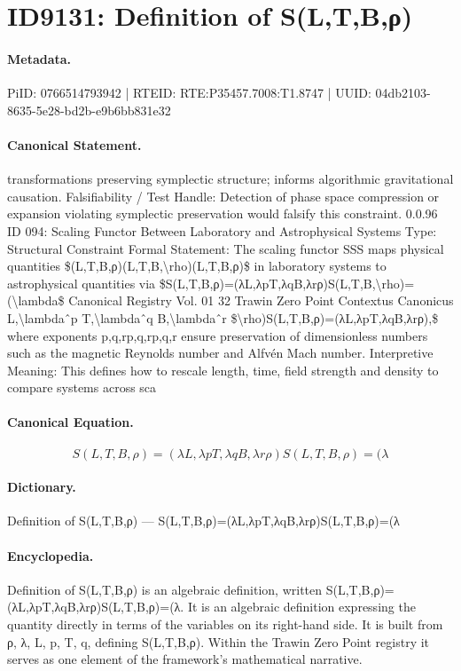 \section*{ID9131: Definition of S(L,T,B,ρ)}
\paragraph{Metadata.}
PiID: 0766514793942 | RTEID: RTE:P35457.7008:T1.8747 | UUID: 04db2103-8635-5e28-bd2b-e9b6bb831e32

\paragraph{Canonical Statement.}
transformations preserving symplectic structure; informs algorithmic gravitational causation. Falsifiability / Test Handle: Detection of phase space compression or expansion violating symplectic preservation would falsify this constraint. 0.0.96 ID 094: Scaling Functor Between Laboratory and Astrophysical Systems Type: Structural Constraint Formal Statement: The scaling functor SSS maps physical quantities \$(L,T,B,ρ)(L,T,B,\textbackslash{}rho)(L,T,B,ρ)\$ in laboratory systems to astrophysical quantities via \$S(L,T,B,ρ)=(λL,λpT,λqB,λrρ)S(L,T,B,\textbackslash{}rho)=(\textbackslash{}lambda\$ Canonical Registry Vol. 01 32 Trawin Zero Point Contextus Canonicus L,\textbackslash{}lambdaˆp T,\textbackslash{}lambdaˆq B,\textbackslash{}lambdaˆr \$\textbackslash{}rho)S(L,T,B,ρ)=(λL,λpT,λqB,λrρ),\$ where exponents p,q,rp,q,rp,q,r ensure preservation of dimensionless numbers such as the magnetic Reynolds number and Alfvén Mach number. Interpretive Meaning: This defines how to rescale length, time, field strength and density to compare systems across sca

\paragraph{Canonical Equation.}
\[
S(L,T,B,ρ)=(λL,λpT,λqB,λrρ)S(L,T,B,\rho)=(\lambda
\]

\paragraph{Dictionary.}
Definition of S(L,T,B,ρ) — S(L,T,B,ρ)=(λL,λpT,λqB,λrρ)S(L,T,B,ρ)=(λ

\paragraph{Encyclopedia.}
Definition of S(L,T,B,ρ) is an algebraic definition, written S(L,T,B,ρ)=(λL,λpT,λqB,λrρ)S(L,T,B,ρ)=(λ. It is an algebraic definition expressing the quantity directly in terms of the variables on its right-hand side. It is built from ρ, λ, L, p, T, q, defining S(L,T,B,ρ). Within the Trawin Zero Point registry it serves as one element of the framework's mathematical narrative.

